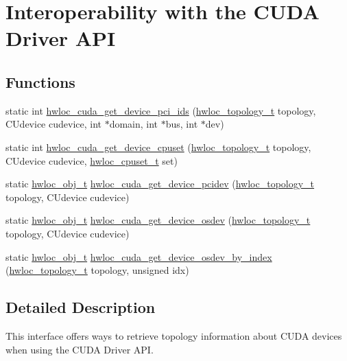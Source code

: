 \hypertarget{a00219}{}\section{Interoperability with the C\+U\+DA Driver A\+PI}
\label{a00219}
\subsection*{Functions}
\begin{DoxyCompactItemize}
\item 
static int \hyperlink{a00219_ga1084285e8ff8b7df91c28917637481c6}{hwloc\+\_\+cuda\+\_\+get\+\_\+device\+\_\+pci\+\_\+ids} (\hyperlink{a00186_ga9d1e76ee15a7dee158b786c30b6a6e38}{hwloc\+\_\+topology\+\_\+t} topology, C\+Udevice cudevice, int $\ast$domain, int $\ast$bus, int $\ast$dev)
\item 
static int \hyperlink{a00219_gaec41c6b4dc3361156beb7dea2a74f5a3}{hwloc\+\_\+cuda\+\_\+get\+\_\+device\+\_\+cpuset} (\hyperlink{a00186_ga9d1e76ee15a7dee158b786c30b6a6e38}{hwloc\+\_\+topology\+\_\+t} topology, C\+Udevice cudevice, \hyperlink{a00183_ga4bbf39b68b6f568fb92739e7c0ea7801}{hwloc\+\_\+cpuset\+\_\+t} set)
\item 
static \hyperlink{a00185_ga79b8ab56877ef99ac59b833203391c7d}{hwloc\+\_\+obj\+\_\+t} \hyperlink{a00219_ga11fed607fa404e29e8da010f3ec128e4}{hwloc\+\_\+cuda\+\_\+get\+\_\+device\+\_\+pcidev} (\hyperlink{a00186_ga9d1e76ee15a7dee158b786c30b6a6e38}{hwloc\+\_\+topology\+\_\+t} topology, C\+Udevice cudevice)
\item 
static \hyperlink{a00185_ga79b8ab56877ef99ac59b833203391c7d}{hwloc\+\_\+obj\+\_\+t} \hyperlink{a00219_ga252cb72175f1a2d682f883a0add80a66}{hwloc\+\_\+cuda\+\_\+get\+\_\+device\+\_\+osdev} (\hyperlink{a00186_ga9d1e76ee15a7dee158b786c30b6a6e38}{hwloc\+\_\+topology\+\_\+t} topology, C\+Udevice cudevice)
\item 
static \hyperlink{a00185_ga79b8ab56877ef99ac59b833203391c7d}{hwloc\+\_\+obj\+\_\+t} \hyperlink{a00219_ga12ee892994ed037e8f64bbffda02cf2e}{hwloc\+\_\+cuda\+\_\+get\+\_\+device\+\_\+osdev\+\_\+by\+\_\+index} (\hyperlink{a00186_ga9d1e76ee15a7dee158b786c30b6a6e38}{hwloc\+\_\+topology\+\_\+t} topology, unsigned idx)
\end{DoxyCompactItemize}


\subsection{Detailed Description}
This interface offers ways to retrieve topology information about C\+U\+DA devices when using the C\+U\+DA Driver A\+PI. 

